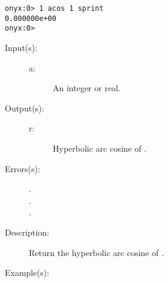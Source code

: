 \begin{description}
\begin{description}
\begin{verbatim}
onyx:0> 1 acos 1 sprint
0.000000e+00
onyx:0>
		\end{verbatim}
	\end{description}
\label{systemdict:acosh}
\item[{\onyxop{a}{acosh}{r}}: ]
	\begin{description}\item[]
	\item[Input(s): ]
		\begin{description}\item[]
		\item[a: ]
			An integer or real.
		\end{description}
	\item[Output(s): ]
		\begin{description}\item[]
		\item[r: ]
			Hyperbolic arc cosine of .
		\end{description}
	\item[Errors(s): ]
		\begin{description}\item[]
		\item[.]
		\item[.]
		\item[.]
		\end{description}
	\item[Description: ]
		Return the hyperbolic arc cosine of .
	\item[Example(s): ]\begin{verbatim}


\end{verbatim}
\end{description}
\end{description}

